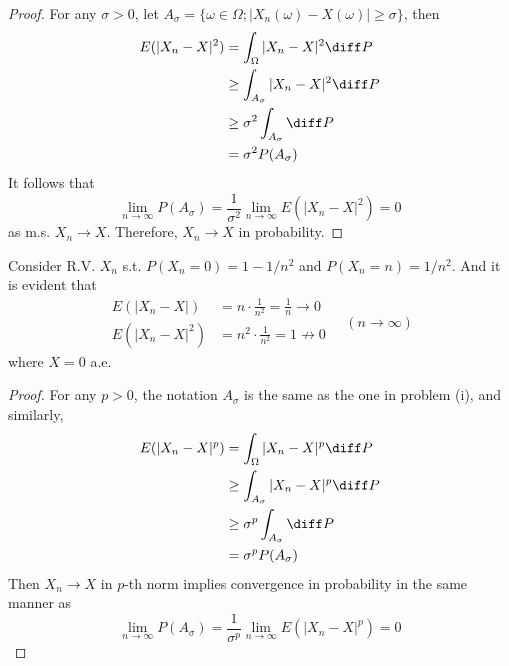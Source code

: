     \begin{subproblem}
        \item
        \begin{proof}
            For any $\sigma>0$, let
            $A_\sigma=\{\omega\in\Omega;|X_n(\omega)-X(\omega)|\geq\sigma\}$,
            then
            \[\begin{aligned}
                E(|X_n-X|^2)&=\int_\Omega|X_n-X|^2\diff P\\
                &\geq\int_{A_\sigma}|X_n-X|^2\diff P\\
                &\geq \sigma^2\int_{A_\sigma}\diff P\\
                &=\sigma^2P(A_\sigma)
            \end{aligned}\]
            It follows that
            \[\lim_{n\to\infty}P(A_\sigma)
            =\frac{1}{\sigma^2}\lim_{n\to\infty}E(|X_n-X|^2)
            =0\]
            as m.s. $X_n\to X$. Therefore, $X_n\to X$ in probability.
        \end{proof}

        \item
        Consider R.V. $X_n$ s.t. $P(X_n=0)=1-1/n^2$ and $P(X_n=n)=1/n^2$.
        And it is evident that
        \[\begin{aligned}
            E(|X_n-X|)&=n\cdot\frac{1}{n^2}=\frac{1}{n}\to 0\\
            E(|X_n-X|^2)&=n^2\cdot\frac{1}{n^2}=1\not\to 0
        \end{aligned}\quad(n\to\infty)\]
        where $X=0$ a.e.

        \item
        \begin{proof}
            For any $p>0$, the notation $A_\sigma$ is the same
            as the one in problem (i), and similarly,
            \[\begin{aligned}
                E(|X_n-X|^p)&=\int_\Omega|X_n-X|^p\diff P\\
                &\geq\int_{A_\sigma}|X_n-X|^p\diff P\\
                &\geq \sigma^p\int_{A_\sigma}\diff P\\
                &=\sigma^pP(A_\sigma)
            \end{aligned}\]
            Then $X_n\to X$ in $p$-th norm implies convergence in
            probability in the same manner as
            \[\lim_{n\to\infty}P(A_\sigma)
            =\frac{1}{\sigma^p}\lim_{n\to\infty}E(|X_n-X|^p)
            =0\]
        \end{proof}


\end{subproblem}
